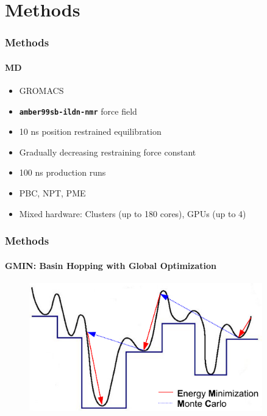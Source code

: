 \documentclass[english]{beamer}
\begin{document}

\section{Methods}

\begin{frame}
    \frametitle{Methods}
    \framesubtitle{MD} 

    \begin{itemize}
        \item GROMACS
        \item \textbf{\texttt{amber99sb-ildn-nmr}} force field
        \item 10 ns position restrained equilibration
        \item Gradually decreasing restraining force constant
        \item 100 ns production runs
        \item PBC, NPT, PME
        \item Mixed hardware: Clusters (up to 180 cores), GPUs (up to 4)
    \end{itemize}

\end{frame}    


\begin{frame}
    \frametitle{Methods}
    \framesubtitle{GMIN: Basin Hopping with Global Optimization}

    \begin{figure}
        \includegraphics[width=0.9\textwidth]{figures/GMIN/GMIN.pdf}
    \end{figure}        

\end{frame}    
\end{document}
